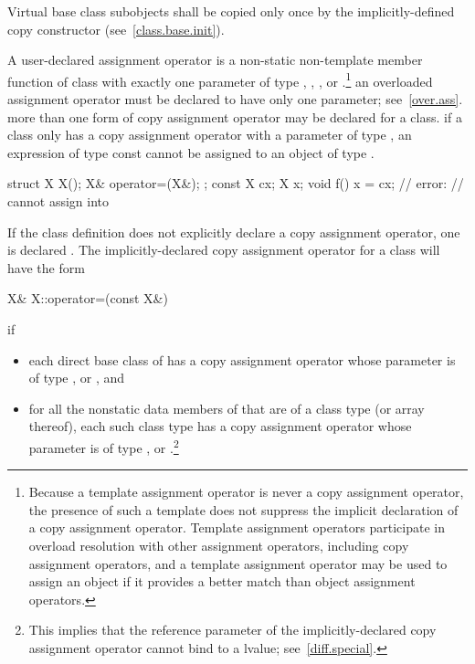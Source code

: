 %
Virtual base class subobjects shall be copied only once by
the implicitly-defined copy constructor (see~\ref{class.base.init}).

\pnum
{}%
A user-declared  assignment operator  is a
non-static non-template member function of class  with exactly one
parameter of type , ,  ,
  or  
.\footnote{Because a template assignment operator
is never a copy assignment
operator, the presence of such a template does not suppress the
implicit declaration of a copy assignment operator.
Template assignment operators
participate in overload resolution with other assignment operators, including
copy assignment operators, and a template assignment operator may
be used to assign an object if it provides a better match than object
assignment operators.}
\enternote
an overloaded assignment operator must be declared to have only one parameter;
see~\ref{over.ass}.
\exitnote
\enternote
more than one form of copy assignment operator may be declared for a class.
\exitnote
\enternote
if a class
only has a copy assignment operator with a parameter of type
,
an expression of type const
cannot be assigned to an object of type
.
\enterexample

\begin{codeblock}
struct X {
	X();
	X& operator=(X&);
};
const X cx;
X x;
void f() {
	x = cx;			// error:
				//  cannot assign  into 
}
\end{codeblock}
\exitexampleb
\exitnoteb

\pnum
{}%
If the class definition does not explicitly declare a copy assignment operator,
one is declared .
The implicitly-declared copy assignment operator for a class
will have the form

\begin{codeblock}
X& X::operator=(const X&)
\end{codeblock}

if

\begin{itemize}
\item
each direct base class
of
has a copy assignment operator whose parameter is of type
,
or
,
and
\item
for all the nonstatic data members of
that are of a class type
(or array thereof),
each such class type has a copy assignment operator whose parameter is of type
,
or
.\footnote{This implies that the reference parameter of the
implicitly-declared copy assignment operator cannot bind to a
lvalue; see~\ref{diff.special}.}
\end{itemize}

